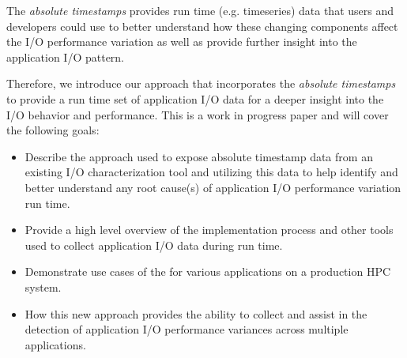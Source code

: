The \emph{absolute timestamps} provides run time (e.g. timeseries) data that users and developers could use to better understand how these changing components affect the I/O performance variation as well as provide further insight into the application I/O pattern.

Therefore, we introduce our \Darshan approach that incorporates the \emph{absolute timestamps} to provide a run time set of application I/O data for a deeper insight into the I/O behavior and performance. This is a work in progress paper and will cover the following goals:
\begin{itemize}
	\item Describe the approach used to expose absolute timestamp data from an existing I/O characterization tool and utilizing this data to help identify and better understand any root cause(s) of application I/O performance variation run time.
	\item Provide a high level overview of the implementation process and other tools used to collect application I/O data during run time.
	\item Demonstrate use cases of the \connector for various applications on a production HPC system. 
	\item How this new approach provides the ability to collect and assist in the detection of application I/O performance variances across multiple applications. 
\end{itemize}